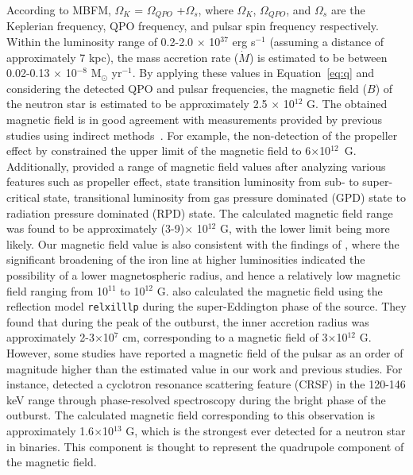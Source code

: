 \documentclass[twocolumn,trackchanges]{aastex631}
\begin{document}
According to MBFM, $\Omega_{K}$ = $\Omega_{QPO}$ +$\Omega_{s}$, where $\Omega_{K}$, $\Omega_{QPO}$, and $\Omega_{s}$ are the Keplerian frequency, QPO frequency, and pulsar spin frequency respectively.  Within the luminosity range of 0.2-2.0 $\times$ 10$^{37}$ erg s$^{-1}$ (assuming a distance of approximately 7 kpc), the mass accretion rate ($\dot{M}$) is estimated to be between 0.02-0.13 $\times$ 10$^{-8}$ M$_{\odot}$ yr$^{-1}$. By applying these values in Equation~\ref{eq:q} and considering the detected QPO and pulsar frequencies, the magnetic field ($B$) of the neutron star is estimated to be approximately 2.5 $\times$ 10$^{12}$ G.  The obtained magnetic field is in good agreement with measurements provided by previous studies using indirect methods~\citep{2018MNRAS.479L.134T, 2020MNRAS.491.1857D, 2022MNRAS.516.1601B}. For example, the non-detection of the propeller effect by \citet{2018MNRAS.479L.134T} constrained the upper limit of the magnetic field to 6$\times$10$^{12}$~G. Additionally, \citet{2020MNRAS.491.1857D} provided a range of magnetic field values after analyzing various features such as propeller effect, state transition luminosity from sub- to super-critical state, transitional luminosity from gas pressure dominated (GPD) state to radiation pressure dominated (RPD) state. The calculated magnetic field range was found to be approximately (3-9)$\times$ 10$^{12}$ G, with the lower limit being more likely. Our magnetic field value is also consistent with the findings of \citet{2019ApJ...885...18J}, where the significant broadening of the iron line at higher luminosities indicated the possibility of a lower magnetospheric radius, and hence a relatively low magnetic field ranging from 10$^{11}$ to 10$^{12}$ G.  \citet{2022MNRAS.516.1601B} also calculated the magnetic field using the reflection model \texttt{relxilllp} during the super-Eddington phase of the source. They found that during the peak of the outburst, the inner accretion radius was approximately 2-3$\times$10$^{7}$ cm, corresponding to a magnetic field of 3$\times$10$^{12}$ G. However, some studies have reported a magnetic field of the pulsar as an order of magnitude higher than the estimated value in our work and previous studies. For instance, \citet{2022ApJ...933L...3K} detected a cyclotron resonance scattering feature (CRSF) in the 120-146 keV range through phase-resolved spectroscopy during the bright phase of the outburst. The calculated magnetic field corresponding to this observation is approximately 1.6$\times$10$^{13}$ G, which is the strongest ever detected for a neutron star in binaries. This component is thought to represent the quadrupole component of the magnetic field.  
\end{document}
